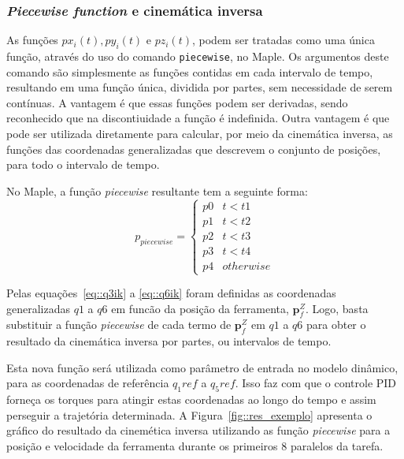 \subsubsection{\textit{Piecewise function} e cinemática inversa}

As funções $px_i(t), py_i(t)$ e $pz_i(t)$, podem ser tratadas como uma única
função, através do uso do comando \texttt{piecewise}, no Maple. Os argumentos
deste comando são simplesmente as funções contidas em cada intervalo de tempo,
resultando em uma função única, dividida por partes, sem necessidade de serem
contínuas. A vantagem é que essas funções podem ser derivadas, sendo reconhecido
que na discontiuidade a função é indefinida.
Outra vantagem é que pode ser utilizada diretamente para calcular, por meio da
cinemática inversa, as funções das coordenadas generalizadas que descrevem o
conjunto de posições, para todo o intervalo de tempo.

No Maple, a função \textit{piecewise} resultante tem a seguinte forma:
%
\begin{equation}
p_{piecewise} = 
\begin{cases}
p0 & t<t1 \\
p1 & t<t2 \\
p2 & t<t3 \\
p3 & t<t4 \\
p4 & otherwise
\end{cases}
\end{equation}
%

Pelas equações~\ref{eq::q3ik} a \ref{eq::q6ik} foram definidas as coordenadas
generalizadas $q1$ a $q6$ em funcão da posição da ferramenta, $\mathbf{p}_f^Z$.
Logo, basta substituir a função \textit{piecewise} de cada termo de
$\mathbf{p}_f^Z$ em $q1$ a $q6$ para obter o resultado da cinemática inversa por
partes, ou intervalos de tempo.

Esta nova função será utilizada como parâmetro de entrada no modelo dinâmico,
para as coordenadas de referência $q_1ref$ a $q_5ref$. Isso faz com que o
controle PID forneça os torques para atingir estas coordenadas ao
longo do tempo e assim perseguir a trajetória determinada. A
Figura~\ref{fig::res_exemplo} apresenta o gráfico do resultado da cinemética
inversa utilizando as função \textit{piecewise} para a posição e velocidade da
ferramenta durante os primeiros 8 paralelos da tarefa. 

